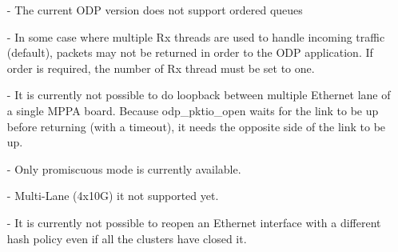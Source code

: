 \documentclass{trkalray}
\begin{document}
\begin{itemize}
\item[-]{The current ODP version does not support ordered queues}
\item[-]{In some case where multiple Rx threads are used to handle incoming traffic
  (default), packets may not be returned in order to the ODP
  application. If order is required, the number of Rx thread must be
  set to one.}
\item[-]{It is currently not possible to do loopback between multiple
  Ethernet lane of a single MPPA board. Because odp\_pktio\_open waits
  for the link to be up before returning (with a timeout), it needs
  the opposite side of the link to be up.}
\item[-]{Only promiscuous mode is currently available.}
\item[-]{Multi-Lane (4x10G) it not supported yet.}
\item[-]{It is currently not possible to reopen an Ethernet interface
  with a different hash policy even if all the clusters have closed it.}
\end{itemize}
\end{document}
